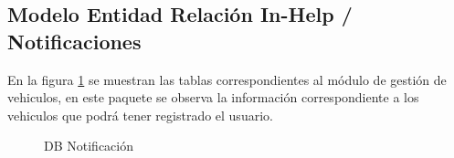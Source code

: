 \subsection{Modelo Entidad Relación In-Help / Notificaciones}
En la figura \ref{fig:BD_Notificacion} se muestran las tablas correspondientes al módulo de gestión de vehiculos, en este paquete se observa la información correspondiente a los vehiculos que podrá tener registrado el usuario.
\begin{figure}[htbp!]
	\centering
	\caption{DB Notificación}
	\label{fig:BD_Notificacion}
\end{figure}

